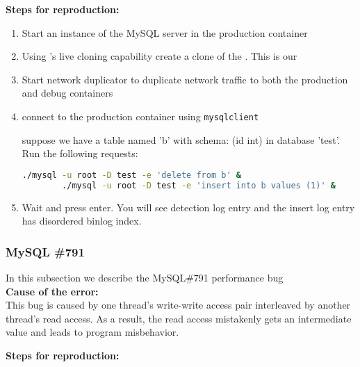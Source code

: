 \noindent \textbf{Steps for reproduction:} \\

\begin{adjustwidth}{0.5cm}{}
	\begin{enumerate}
		\item Start an instance of the MySQL server in the production container
		\item Using \parikshan's live cloning capability create a clone of the \productioncontainer. This is our \debugcontainer
		\item Start network duplicator to duplicate network traffic to both the production and debug containers
		\item connect to the production container using \texttt{mysqlclient}
		
		suppose we have a table named 'b' with schema: (id int) in database 'test'.
		Run the following requests:
		
		\begin{lstlisting}[language=sh]
		./mysql -u root -D test -e 'delete from b' &
		./mysql -u root -D test -e 'insert into b values (1)' &
		\end{lstlisting}
		
		\item Wait and press enter. You will see detection log entry and the insert log entry has disordered binlog index.
		
	\end{enumerate}
\end{adjustwidth}	


\subsubsection{MySQL \#791}

In this subsection we describe the MySQL\#791 performance bug \\

\noindent \textbf{Cause of the error:} \\

This bug is caused by one thread's write-write access pair interleaved by another thread's read access. As a result, the read access mistakenly gets an intermediate value and leads to program misbehavior.

\noindent \textbf{Steps for reproduction:} \\

